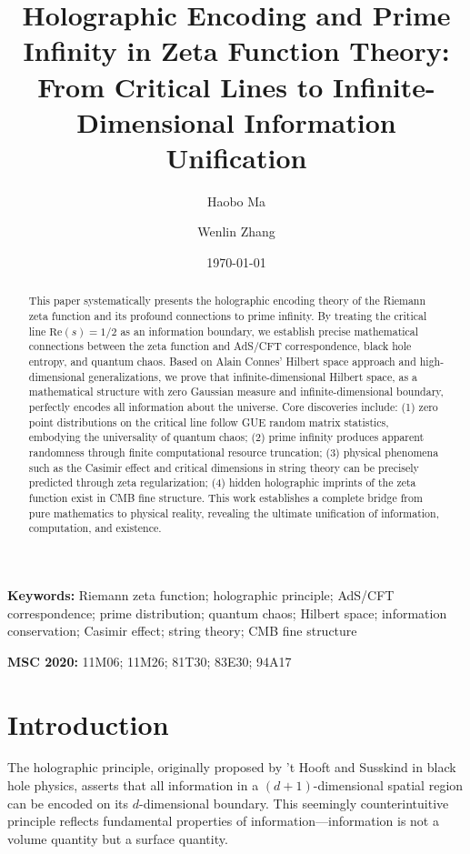 \documentclass[12pt]{article}
\title{Holographic Encoding and Prime Infinity in Zeta Function Theory: \\
From Critical Lines to Infinite-Dimensional Information Unification}
\author{Haobo Ma \and Wenlin Zhang}
\date{\today}
\begin{document}
\maketitle

\begin{abstract}
This paper systematically presents the holographic encoding theory of the Riemann zeta function and its profound connections to prime infinity. By treating the critical line $\text{Re}(s) = 1/2$ as an information boundary, we establish precise mathematical connections between the zeta function and AdS/CFT correspondence, black hole entropy, and quantum chaos. Based on Alain Connes' Hilbert space approach and high-dimensional generalizations, we prove that infinite-dimensional Hilbert space, as a mathematical structure with zero Gaussian measure and infinite-dimensional boundary, perfectly encodes all information about the universe. Core discoveries include: (1) zero point distributions on the critical line follow GUE random matrix statistics, embodying the universality of quantum chaos; (2) prime infinity produces apparent randomness through finite computational resource truncation; (3) physical phenomena such as the Casimir effect and critical dimensions in string theory can be precisely predicted through zeta regularization; (4) hidden holographic imprints of the zeta function exist in CMB fine structure. This work establishes a complete bridge from pure mathematics to physical reality, revealing the ultimate unification of information, computation, and existence.
\end{abstract}

\textbf{Keywords:} Riemann zeta function; holographic principle; AdS/CFT correspondence; prime distribution; quantum chaos; Hilbert space; information conservation; Casimir effect; string theory; CMB fine structure

\textbf{MSC 2020:} 11M06; 11M26; 81T30; 83E30; 94A17

\section{Introduction}

The holographic principle, originally proposed by 't Hooft and Susskind in black hole physics, asserts that all information in a $(d+1)$-dimensional spatial region can be encoded on its $d$-dimensional boundary. This seemingly counterintuitive principle reflects fundamental properties of information—information is not a volume quantity but a surface quantity.
\end{document}
